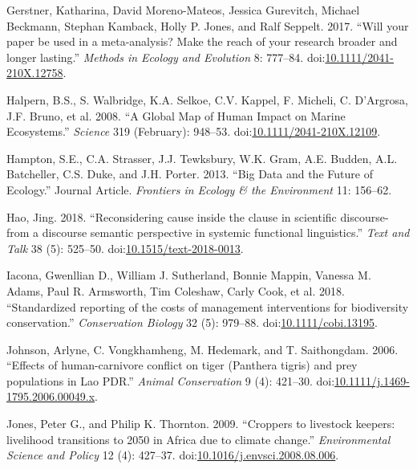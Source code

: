 \documentclass[fleqn,10pt]{wlpeerj} %
\begin{document}
\hypertarget{ref-Gerstner2017}{}
Gerstner, Katharina, David Moreno-Mateos, Jessica Gurevitch, Michael
Beckmann, Stephan Kamback, Holly P. Jones, and Ralf Seppelt. 2017.
``Will your paper be used in a meta-analysis? Make the reach of your
research broader and longer lasting.'' \emph{Methods in Ecology and
Evolution} 8: 777--84.
doi:\href{https://doi.org/10.1111/2041-210X.12758}{10.1111/2041-210X.12758}.

\hypertarget{ref-Halpern2008}{}
Halpern, B.S., S. Walbridge, K.A. Selkoe, C.V. Kappel, F. Micheli, C.
D'Argrosa, J.F. Bruno, et al. 2008. ``A Global Map of Human Impact on
Marine Ecosystems.'' \emph{Science} 319 (February): 948--53.
doi:\href{https://doi.org/10.1111/2041-210X.12109}{10.1111/2041-210X.12109}.

\hypertarget{ref-Hampton2013}{}
Hampton, S.E., C.A. Strasser, J.J. Tewksbury, W.K. Gram, A.E. Budden,
A.L. Batcheller, C.S. Duke, and J.H. Porter. 2013. ``Big Data and the
Future of Ecology.'' Journal Article. \emph{Frontiers in Ecology \& the
Environment} 11: 156--62.

\hypertarget{ref-Hao2018}{}
Hao, Jing. 2018. ``Reconsidering cause inside the clause in scientific
discourse-from a discourse semantic perspective in systemic functional
linguistics.'' \emph{Text and Talk} 38 (5): 525--50.
doi:\href{https://doi.org/10.1515/text-2018-0013}{10.1515/text-2018-0013}.

\hypertarget{ref-Iacona2018}{}
Iacona, Gwenllian D., William J. Sutherland, Bonnie Mappin, Vanessa M.
Adams, Paul R. Armsworth, Tim Coleshaw, Carly Cook, et al. 2018.
``Standardized reporting of the costs of management interventions for
biodiversity conservation.'' \emph{Conservation Biology} 32 (5):
979--88.
doi:\href{https://doi.org/10.1111/cobi.13195}{10.1111/cobi.13195}.

\hypertarget{ref-Johnson2006}{}
Johnson, Arlyne, C. Vongkhamheng, M. Hedemark, and T. Saithongdam. 2006.
``Effects of human-carnivore conflict on tiger (Panthera tigris) and
prey populations in Lao PDR.'' \emph{Animal Conservation} 9 (4):
421--30.
doi:\href{https://doi.org/10.1111/j.1469-1795.2006.00049.x}{10.1111/j.1469-1795.2006.00049.x}.

\hypertarget{ref-Jones2009}{}
Jones, Peter G., and Philip K. Thornton. 2009. ``Croppers to livestock
keepers: livelihood transitions to 2050 in Africa due to climate
change.'' \emph{Environmental Science and Policy} 12 (4): 427--37.
doi:\href{https://doi.org/10.1016/j.envsci.2008.08.006}{10.1016/j.envsci.2008.08.006}.
\end{document}
